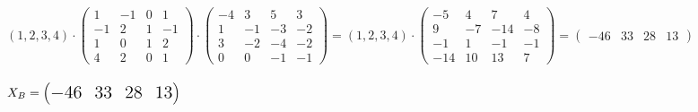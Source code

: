 \documentclass[12pt]{article}
\begin{document}
$(1,2,3,4)\cdot\left(\begin{matrix}
            1  & -1 & 0 & 1  \\
            -1 & 2  & 1 & -1 \\
            1  & 0  & 1 & 2  \\
            4  & 2  & 0 & 1
        \end{matrix}\right)\cdot\left(\begin{matrix}
            -4 & 3  & 5  & 3  \\
            1  & -1 & -3 & -2 \\
            3  & -2 & -4 & -2 \\
            0  & 0  & -1 & -1
        \end{matrix}\right)=(1,2,3,4)\cdot\left(\begin{matrix}
            -5  & 4  & 7   & 4  \\
            9   & -7 & -14 & -8 \\
            -1  & 1  & -1  & -1 \\
            -14 & 10 & 13  & 7
        \end{matrix}\right)=\left(\begin{matrix}
            -46 & 33 & 28 & 13
        \end{matrix}\right)$\\\\
$\Large X_B=\left(\begin{matrix}
            -46 & 33 & 28 & 13
        \end{matrix}\right)$
\end{document}
